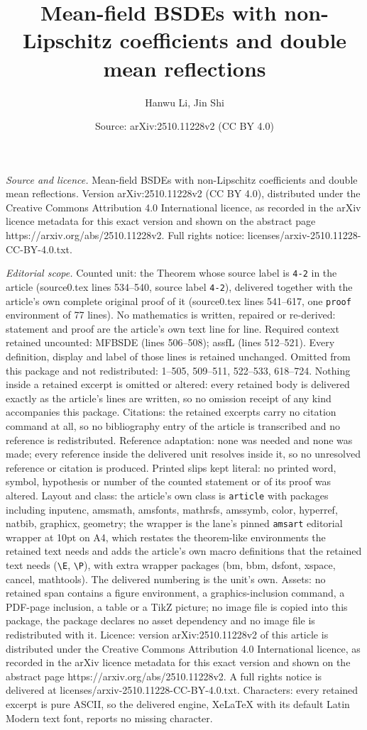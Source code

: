 \documentclass[10pt,a4paper]{amsart}
\title[Mean-field BSDEs with non-Lipschitz coefficients and double ]{Mean-field BSDEs with non-Lipschitz coefficients and double mean reflections}
\author{Hanwu Li, Jin Shi}
\date{Source: arXiv:2510.11228v2 (CC BY 4.0)}
\begin{document}
\maketitle

\noindent\emph{Source and licence.} Mean-field BSDEs with non-Lipschitz coefficients and double mean reflections. Version arXiv:2510.11228v2 (CC BY 4.0), distributed under the Creative Commons Attribution 4.0 International licence, as recorded in the arXiv licence metadata for this exact version and shown on the abstract page https://arxiv.org/abs/2510.11228v2. Full rights notice: licenses/arxiv-2510.11228-CC-BY-4.0.txt.\par\smallskip

\noindent\textit{Editorial scope.} Counted unit: the Theorem whose source label is \texttt{4-2} in the article (source0.tex lines 534--540, source label \texttt{4-2}), delivered together with the article's own complete original proof of it (source0.tex lines 541--617, one \texttt{proof} environment of 77 lines). No mathematics is written, repaired or re-derived: statement and proof are the article's own text line for line. Required context retained uncounted: MFBSDE (lines 506--508); assfL (lines 512--521). Every definition, display and label of those lines is retained unchanged. Omitted from this package and not redistributed: 1--505, 509--511, 522--533, 618--724. Nothing inside a retained excerpt is omitted or altered: every retained body is delivered exactly as the article's lines are written, so no omission receipt of any kind accompanies this package. Citations: the retained excerpts carry no citation command at all, so no bibliography entry of the article is transcribed and no reference is redistributed. Reference adaptation: none was needed and none was made; every reference inside the delivered unit resolves inside it, so no unresolved reference or citation is produced. Printed slips kept literal: no printed word, symbol, hypothesis or number of the counted statement or of its proof was altered. Layout and class: the article's own class is \texttt{article} with packages including inputenc, amsmath, amsfonts, mathrsfs, amssymb, color, hyperref, natbib, graphicx, geometry; the wrapper is the lane's pinned \texttt{amsart} editorial wrapper at 10pt on A4, which restates the theorem-like environments the retained text needs and adds the article's own macro definitions that the retained text needs (\texttt{\textbackslash E}, \texttt{\textbackslash P}), with extra wrapper packages (bm, bbm, dsfont, xspace, cancel, mathtools). The delivered numbering is the unit's own. Assets: no retained span contains a figure environment, a graphics-inclusion command, a PDF-page inclusion, a table or a TikZ picture; no image file is copied into this package, the package declares no asset dependency and no image file is redistributed with it. Licence: version arXiv:2510.11228v2 of this article is distributed under the Creative Commons Attribution 4.0 International licence, as recorded in the arXiv licence metadata for this exact version and shown on the abstract page https://arxiv.org/abs/2510.11228v2. A full rights notice is delivered at licenses/arxiv-2510.11228-CC-BY-4.0.txt. Characters: every retained excerpt is pure ASCII, so the delivered engine, XeLaTeX with its default Latin Modern text font, reports no missing character.
\end{document}
